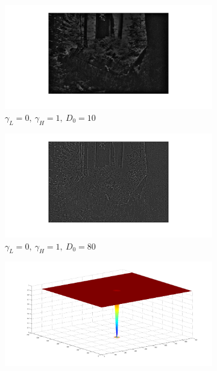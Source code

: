 		\begin{figure}[h!]
			\centering
			\begin{subfigure}[b]{0.7\textwidth}
				\includegraphics[width=\textwidth]{pics/low_sigma.png}
				\caption{$\gamma_L = 0,~\gamma_H = 1,~D_0 = 10$}
				\label{fig:low_sigma}
			\end{subfigure}%
			\begin{subfigure}[b]{0.7\textwidth}
				\includegraphics[width=\textwidth]{pics/high_sigma.png}
				\caption{$\gamma_L = 0,~\gamma_H = 1,~D_0 =80$}
				\label{fig:high_sigma}
			\end{subfigure}
			\label{fig:sigma}
			\begin{subfigure}[b]{0.6\textwidth}
				\includegraphics[width=\textwidth]{pics/low_sigma_filter.png}

\end{subfigure}
\end{figure}
